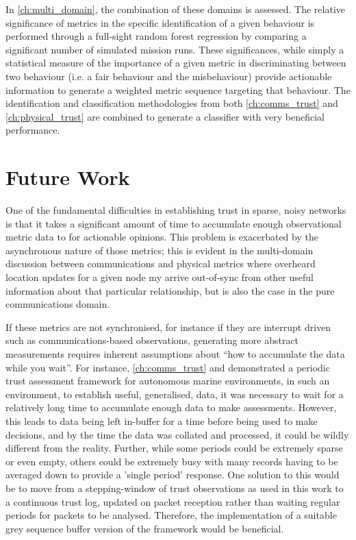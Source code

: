 In \autoref{ch:multi_domain}, the combination of these domains is assessed.
The relative significance of metrics in the specific identification of a given behaviour is performed through a full-sight random forest regression by comparing a significant number of simulated mission runs.
These significances, while simply a statistical measure of the importance of a given metric in discriminating between two behaviour (i.e. a fair behaviour and the misbehaviour) provide actionable information to generate a weighted metric sequence targeting that behaviour.
The identification and classification methodologies from both \autoref{ch:comms_trust} and \autoref{ch:physical_trust} are combined to generate a classifier with very beneficial performance.


\section{Future Work}
One of the fundamental difficulties in establishing trust in sparse, noisy networks is that it takes a significant amount of time to accumulate enough observational metric data to for actionable opinions.
This problem is exacerbated by the asynchronous nature of those metrics; this is evident in the multi-domain discussion between communications and physical metrics where overheard location updates for a given node my arrive out-of-sync from other useful information about that particular relationship, but is also the case in the pure communications domain.

If these metrics are not synchronised, for instance if they are interrupt driven such as communications-based observations, generating more abstract measurements requires inherent assumptions about ``how to accumulate the data while you wait''. 
For instance, \autoref{ch:comms_trust} and \cite{Bolster2015} demonstrated a periodic trust assessment framework for autonomous marine environments, in such an environment, to establish useful, generalised, data, it was necessary to wait for a relatively long time to accumulate enough data to make assessments.
However, this leads to data being left in-buffer for a time before being used to make decisions, and by the time the data was collated and processed, it could be wildly different from the reality. 
Further, while some periods could be extremely sparse or even empty, others could be extremely busy with many records having to be averaged down to provide a 'single period' response. 
One solution to this would be to move from a stepping-window of trust observations as used in this work to a continuous trust log, updated on packet reception rather than waiting regular periods for packets to be analysed.
Therefore, the implementation of a suitable grey sequence buffer version of the framework would be beneficial.


